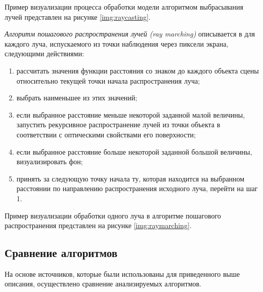 Пример визуализации процесса обработки модели алгоритмом выбрасывания лучей представлен на рисунке \ref{img:raycasting}.



\textit{Алгоритм пошагового распространения лучей (ray marching)} описывается в \cite{bredenbals2022visualising} для каждого луча, испускаемого из точки наблюдения через пиксели экрана, следующими действиями:
\begin{enumerate}
	\item рассчитать значения функции расстояния со знаком до каждого объекта сцены относительно текущей точки начала распространения луча;
	\item выбрать наименьшее из этих значений;
	\item если выбранное расстояние меньше некоторой заданной малой величины, запустить рекурсивное распространение лучей из точки объекта в соответствии с оптическими свойствами его поверхности;
	\item если выбранное расстояние больше некоторой заданной большой величины, визуализировать фон;
	\item принять за следующую точку начала ту, которая находится на выбранном расстоянии по направлению распространения исходного луча, перейти на шаг 1.
\end{enumerate}

Пример визуализации обработки одного луча в алгоритме пошагового распространения представлен на рисунке \ref{img:raymarching}.


\subsection{Сравнение алгоритмов}

На основе источников, которые были использованы для приведенного выше описания, осуществлено сравнение анализируемых алгоритмов.

